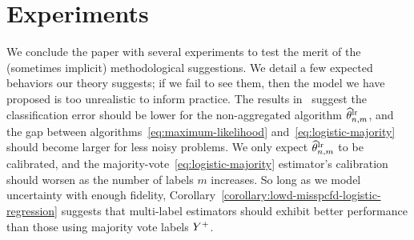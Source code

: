 
\newcommand{\logit}{\mathop{\rm logit}}

\section{Experiments}
\label{sec:experiments}



We conclude the paper with several experiments to 
test the merit of the (sometimes implicit)
methodological suggestions.
We detail a few expected behaviors our theory suggests; if
we fail to see them, then the model we have proposed is too unrealistic to
inform practice.
%
The results
in~ suggest the classification error should be
lower for the non-aggregated algorithm $\widehat{\theta}^{\textup{lr}}_{n,m}$, and the gap between
algorithms~\eqref{eq:maximum-likelihood} and~\eqref{eq:logistic-majority}
should become larger for less noisy problems.
%
We only
expect $\widehat{\theta}^{\textup{lr}}_{n,m}$ to be calibrated, and the
majority-vote~\eqref{eq:logistic-majority}
estimator's calibration should worsen as the number of labels $m$
increases. So long as we model uncertainty with enough fidelity,
Corollary~\ref{corollary:lowd-misspcfd-logistic-regression} suggests
that multi-label estimators should exhibit better performance than
those using majority vote labels $Y^+$.

